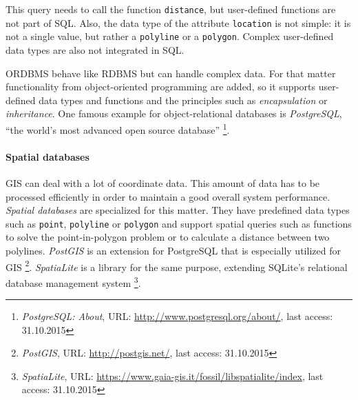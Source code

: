 This query needs to call the function \texttt{distance}, but user-defined functions are not part of SQL. Also, the data type of the attribute \texttt{location} is not simple: it is not a single value, but rather a \texttt{polyline} or a \texttt{polygon}. Complex user-defined data types are also not integrated in SQL.

ORDBMS behave like RDBMS but can handle complex data. For that matter functionality from object-oriented programming are added, so it supports user-defined data types and functions and the principles such as \emph{encapsulation} or \emph{inheritance}.
One famous example for object-relational databases is \emph{PostgreSQL}, ``the world's most advanced open source database''
\footnote{
  \textit{PostgreSQL: About},
  URL: \url{http://www.postgresql.org/about/},
  last access: 31.10.2015
}.

\paragraph{Spatial databases} %
\label{par:spatial_databases}
GIS can deal with a lot of coordinate data. This amount of data has to be processed efficiently in order to maintain a good overall system performance. \emph{Spatial databases} are specialized for this matter. They have predefined data types such as \texttt{point}, \texttt{polyline} or \texttt{polygon} and support spatial queries such as functions to solve the point-in-polygon problem or to calculate a distance between two polylines. \emph{PostGIS} is an extension for PostgreSQL that is especially utilized for GIS
\footnote{
  \textit{PostGIS},
  URL: \url{http://postgis.net/},
  last access: 31.10.2015
}.
\emph{SpatiaLite} is a library for the same purpose, extending SQLite's relational database management system
\footnote{
  \textit{SpatiaLite},
  URL: \url{https://www.gaia-gis.it/fossil/libspatialite/index},
  last access: 31.10.2015
}.


